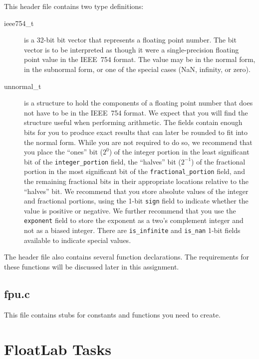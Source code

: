     This header file contains two type definitions:
    \begin{description}
        \item[ieee754\_t] is a 32-bit bit vector that represents a floating point number.
            The bit vector is to be interpreted as though it were a single-precision floating point value in the IEEE~754 format.
            The value may be in the normal form, in the subnormal form, or one of the special cases (NaN, infinity, or zero).
        \item[unnormal\_t] is a structure to hold the components of a floating point number that does not have to be in the IEEE~754 format.
            We expect that you will find the structure useful when performing arithmetic.
            The fields contain enough bits for you to produce exact results that can later be rounded to fit into the normal form.
            While you are not required to do so, we recommend that you place the ``ones'' bit ($2^0$) of the integer portion in the least significant bit of the \lstinline{integer_portion} field, the ``halves'' bit ($2^{-1}$) of the fractional portion in the most significant bit of the \lstinline{fractional_portion} field, and the remaining fractional bits in their appropriate locations relative to the ``halves'' bit.
            We recommend that you store absolute values of the integer and fractional portions, using the 1-bit \lstinline{sign} field to indicate whether the value is positive or negative.
            We further recommend that you use the \lstinline{exponent} field to store the exponent as a two's complement integer and not as a biased integer.
            There are \lstinline{is_infinite} and \lstinline{is_nan} 1-bit fields available to indicate special values.
    \end{description}
    The header file also contains several function declarations.
    The requirements for these functions will be discussed later in this assignment.

    \subsection{fpu.c}

    This file contains stubs for constants and functions you need to create.


    \section{FloatLab Tasks}

